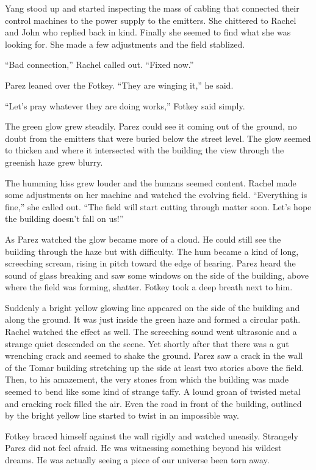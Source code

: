 Yang stood up and started inspecting the mass of cabling that connected their control machines
to the power supply to the emitters. She chittered to Rachel and John who replied back in kind.
Finally she seemed to find what she was looking for. She made a few adjustments and the field
stablized.

``Bad connection,'' Rachel called out. ``Fixed now.''

Parez leaned over the Fotkey. ``They are winging it,'' he said.

``Let's pray whatever they are doing works,'' Fotkey said simply.

The green glow grew steadily. Parez could see it coming out of the ground, no doubt from the
emitters that were buried below the street level. The glow seemed to thicken and where it
intersected with the building the view through the greenish haze grew blurry.

The humming hiss grew louder and the humans seemed content. Rachel made some adjustments on her
machine and watched the evolving field. ``Everything is fine,'' she called out. ``The field will
start cutting through matter soon. Let's hope the building doesn't fall on us!''

As Parez watched the glow became more of a cloud. He could still see the building through the
haze but with difficulty. The hum became a kind of long, screeching scream, rising in pitch
toward the edge of hearing. Parez heard the sound of glass breaking and saw some windows on the
side of the building, above where the field was forming, shatter. Fotkey took a deep breath next
to him.

Suddenly a bright yellow glowing line appeared on the side of the building and along the ground.
It was just inside the green haze and formed a circular path. Rachel watched the effect as well.
The screeching sound went ultrasonic and a strange quiet descended on the scene. Yet shortly
after that there was a gut wrenching crack and seemed to shake the ground. Parez saw a crack in
the wall of the Tomar building stretching up the side at least two stories above the field.
Then, to his amazement, the very stones from which the building was made seemed to bend like
some kind of strange taffy. A lound groan of twisted metal and cracking rock filled the air.
Even the road in front of the building, outlined by the bright yellow line started to twist in
an impossible way.

Fotkey braced himself against the wall rigidly and watched uneasily. Strangely Parez did not
feel afraid. He was witnessing something beyond his wildest dreams. He was actually seeing a
piece of our universe been torn away.

